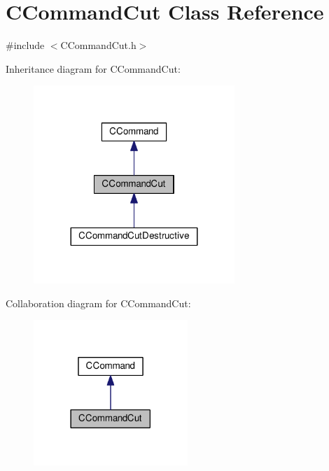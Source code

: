 \hypertarget{classCCommandCut}{}\section{C\+Command\+Cut Class Reference}
\label{classCCommandCut}


{\ttfamily \#include $<$C\+Command\+Cut.\+h$>$}



Inheritance diagram for C\+Command\+Cut\+:\nopagebreak
\begin{figure}[H]
\begin{center}
\leavevmode
\includegraphics[width=215pt]{classCCommandCut__inherit__graph}
\end{center}
\end{figure}


Collaboration diagram for C\+Command\+Cut\+:\nopagebreak
\begin{figure}[H]
\begin{center}
\leavevmode
\includegraphics[width=165pt]{classCCommandCut__coll__graph}
\end{center}
\end{figure}
